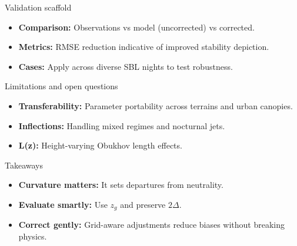 \documentclass[aspectratio=169]{beamer}
\begin{document}
\begin{frame}{Validation scaffold}
  \begin{center}
    
  \end{center}
  \begin{itemize}
    \item \textbf{Comparison:} Observations vs model (uncorrected) vs corrected.
    \item \textbf{Metrics:} RMSE reduction indicative of improved stability depiction.
    \item \textbf{Cases:} Apply across diverse SBL nights to test robustness.
  \end{itemize}
\end{frame}

\begin{frame}{Limitations and open questions}
  \begin{itemize}
    \item \textbf{Transferability:} Parameter portability across terrains and urban canopies.
    \item \textbf{Inflections:} Handling mixed regimes and nocturnal jets.
    \item \textbf{L(z):} Height-varying Obukhov length effects.
  \end{itemize}
\end{frame}

\begin{frame}{Takeaways}
  \begin{itemize}
    \item \textbf{Curvature matters:} It sets departures from neutrality.
    \item \textbf{Evaluate smartly:} Use \(z_g\) and preserve \(2\Delta\).
    \item \textbf{Correct gently:} Grid-aware adjustments reduce biases without breaking physics.
  \end{itemize}
\end{frame}
\end{document}
